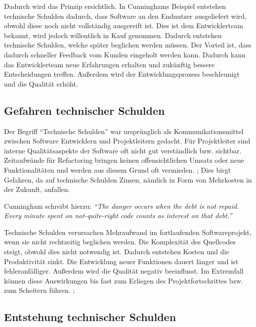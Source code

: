 \documentclass[acmtog]{acmart}
\begin{document}
Dadurch wird das Prinzip ersichtlich. In Cunninghams Beispiel entstehen
technische Schulden dadurch, dass Software an den Endnutzer ausgeliefert
wird, obwohl diese noch nicht vollständig ausgereift ist. Dies ist dem
Entwicklerteam bekannt, wird jedoch willentlich in Kauf genommen. Dadurch
entstehen technische Schulden, welche später beglichen werden müssen. Der
Vorteil ist, dass dadurch schneller Feedback vom Kunden eingeholt werden
kann. Dadurch kann das Entwicklerteam neue Erfahrungen erhalten und
zukünftig bessere Entscheidungen treffen. Außerdem wird der
Entwicklungsprozess beschleunigt und die Qualität erhöht. \cite{Ylihuumo16}

\subsection{Gefahren technischer Schulden}\label{sec:GefahrenTS}

Der Begriff “Technische Schulden” war ursprünglich als Kommunikationsmittel
zwischen Software Entwicklern und Projektleitern gedacht. Für Projektleiter
sind interne Qualitätsaspekte der Software oft nicht gut verständlich bzw.
sichtbar. Zeitaufwände für Refactoring bringen keinen offensichtlichen Umsatz
oder neue Funktionalitäten und werden aus diesem Grund oft vermieden. \cite{Tom13}; \cite{Brown10}
Dies birgt Gefahren, da auf technische Schulden Zinsen, nämlich in Form von
Mehrkosten in der Zukunft, anfallen.

Cunningham schreibt hierzu: \textit{“The danger occurs when the debt is not repaid.
  Every minute spent on not-quite-right code counts as interest on that debt.”} \cite{Cunningham92}

Technische Schulden verursachen Mehraufwand im fortlaufenden Softwareprojekt,
wenn sie nicht rechtzeitig beglichen werden. Die Komplexität des Quellcodes
steigt, obwohl dies nicht notwendig ist. Dadurch entstehen Kosten und die
Produktivität sinkt. Die Entwicklung neuer Funktionen dauert länger und ist
fehleranfälliger. Außerdem wird die Qualität negativ beeinflusst. Im
Extremfall können diese Auswirkungen bis fast zum Erliegen des
Projektfortschrittes bzw. zum Scheitern führen. \cite{Tom13}; \cite{Ylihuumo16}

\subsection{Entstehung technischer Schulden}\label{sec:EntstehungTS}
\end{document}
